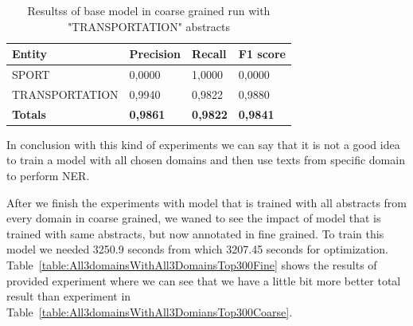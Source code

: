 \documentclass[thesis=M,english]{FITthesis}[2018/05/30]
\begin{document}
	\begin{table}[H]\centering
		\begin{tabular}{|l|l|l|l|}
			\hline {\textbf{Entity}} & {\textbf{Precision}} & {\textbf{Recall}} & {\textbf{F1 score}}\\\hline
				SPORT & 0,0000 & 1,0000 & 0,0000\\
				TRANSPORTATION & 0,9940 & 0,9822 & 0,9880\\\hline
				\textbf{Totals} & \textbf{0,9861} & \textbf{0,9822} & \textbf{0,9841}\\\hline
		\end{tabular}
	\caption{Resultss of base model in coarse grained run with "TRANSPORTATION" abstracts \label{table:All3domainsWithTransportationTop300Coarse}}
	\end{table}	
	
	In conclusion with this kind of experiments we can say that it is not a good idea to train a model with all chosen domains and then use texts from specific domain to perform NER.
	
	After we finish the experiments with model that is trained with all abstracts from every domain in coarse grained, we waned to see the impact of model that is trained with same abstracts, but now annotated in fine grained. To train this model we needed 3250.9 seconds from which 3207.45 seconds for optimization. Table~\ref{table:All3domainsWithAll3DomainsTop300Fine} shows the results of provided experiment where we can see that we have a little bit more better total result than experiment in Table~\ref{table:All3domainsWithAll3DomiansTop300Coarse}.
\end{document}
